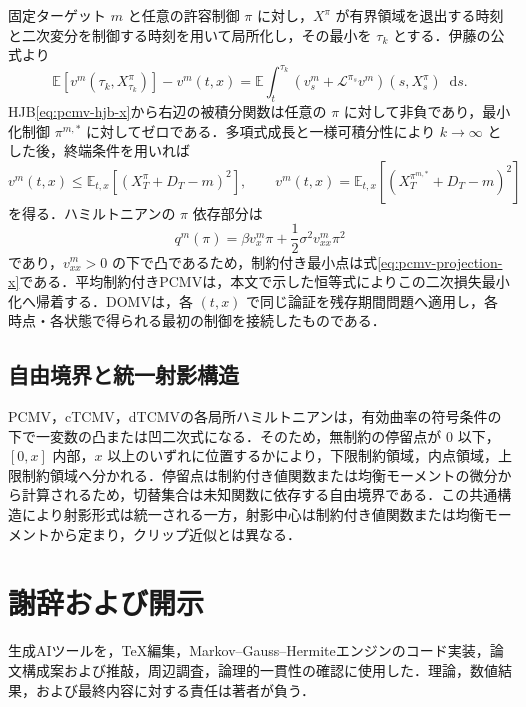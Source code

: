 \documentclass[10pt,a4paper]{article}
\theoremstyle{plain}
\theoremstyle{definition}
\newcommand{\E}{\mathbb{E}}
\newcommand{\Lop}{\mathcal{L}}
\newcommand{\dd}{\mathop{}\!\mathrm{d}}
\begin{document}
固定ターゲット $m$ と任意の許容制御 $\pi$ に対し，$X^\pi$ が有界領域を退出する時刻と二次変分を制御する時刻を用いて局所化し，その最小を $\tau_k$ とする．伊藤の公式より
\begin{equation}
 \E[v^m(\tau_k,X_{\tau_k}^\pi)]-v^m(t,x)
 =\E\int_t^{\tau_k}
 \left(v_s^m+\Lop^{\pi_s}v^m\right)(s,X_s^\pi)\dd s.
 \label{eq:app-pcmv-ito}
\end{equation}
HJB\eqref{eq:pcmv-hjb-x}から右辺の被積分関数は任意の $\pi$ に対して非負であり，最小化制御 $\pi^{m,*}$ に対してゼロである．多項式成長と一様可積分性により $k\to\infty$ とした後，終端条件を用いれば
\[
 v^m(t,x)\leq \E_{t,x}[(X_T^\pi+D_T-m)^2],
 \qquad
 v^m(t,x)=\E_{t,x}[(X_T^{\pi^{m,*}}+D_T-m)^2]
\]
を得る．ハミルトニアンの $\pi$ 依存部分は
\[
 q^m(\pi)=\beta v_x^m\pi+\frac12\sigma^2v_{xx}^m\pi^2
\]
であり，$v_{xx}^m>0$ の下で凸であるため，制約付き最小点は式\eqref{eq:pcmv-projection-x}である．平均制約付きPCMVは，本文で示した恒等式によりこの二次損失最小化へ帰着する．DOMVは，各 $(t,x)$ で同じ論証を残存期間問題へ適用し，各時点・各状態で得られる最初の制御を接続したものである．

\subsection*{自由境界と統一射影構造}

PCMV，cTCMV，dTCMVの各局所ハミルトニアンは，有効曲率の符号条件の下で一変数の凸または凹二次式になる．そのため，無制約の停留点が $0$ 以下，$[0,x]$ 内部，$x$ 以上のいずれに位置するかにより，下限制約領域，内点領域，上限制約領域へ分かれる．停留点は制約付き値関数または均衡モーメントの微分から計算されるため，切替集合は未知関数に依存する自由境界である．この共通構造により射影形式は統一される一方，射影中心は制約付き値関数または均衡モーメントから定まり，クリップ近似とは異なる．


\section*{謝辞および開示}
生成AIツールを，TeX編集，Markov--Gauss--Hermiteエンジンのコード実装，論文構成案および推敲，周辺調査，論理的一貫性の確認に使用した．理論，数値結果，および最終内容に対する責任は著者が負う．
\end{document}

